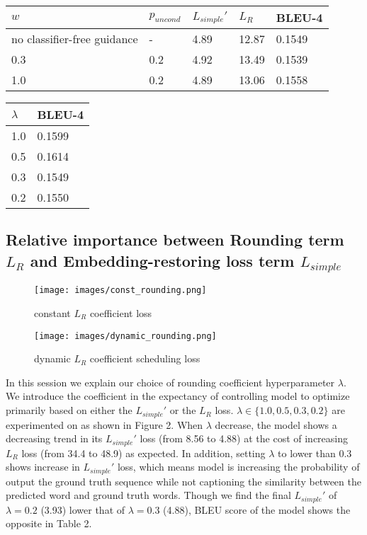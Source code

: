 \documentclass{article}
\begin{document}
\begin{minipage}[c]{0.5\textwidth}
\centering
\begin{tabular}{lllll}
\toprule
$w$ & $p_{uncond}$ & $L_{simple}'$ & $L_R$ & BLEU-4 \\
\midrule
no classifier-free guidance & - & 4.89 & 12.87 & 0.1549 \\
0.3 & 0.2 & 4.92 & 13.49 & 0.1539 \\
1.0 & 0.2 & 4.89 & 13.06 & 0.1558
\bottomrule
\end{tabular}
\label{tab:table1}
\end{minipage}
\begin{minipage}[c]{0.5\textwidth}
\centering
\begin{tabular}{ll}
\toprule
$\lambda$     & BLEU-4 \\
\midrule
1.0     & 0.1599 \\
0.5     & 0.1614 \\
0.3     & 0.1549 \\
0.2     & 0.1550
\bottomrule
\end{tabular}
\label{tab:const-lambda}
\end{minipage}


\subsection{Relative importance between Rounding term $L_R$ and Embedding-restoring loss term $L_{simple}$}
\label{sec:lambda-exp}
\begin{figure}
  \centering
  \texttt{[image: images/const\_rounding.png]}
  \caption{constant $L_R$ coefficient loss}
  \label{fig:const-lambda}
\end{figure}

\begin{figure}
  \centering
  \texttt{[image: images/dynamic\_rounding.png]}
  \caption{dynamic $L_R$ coefficient scheduling loss}
  \label{fig:dynamic-lambda}
\end{figure}

In this session we explain our choice of rounding coefficient hyperparameter $\lambda$. We introduce the coefficient in the expectancy of controlling model to optimize primarily based on either the $L_{simple}'$ or the $L_R$ loss. $\lambda \in \{1.0, 0.5, 0.3, 0.2\}$ are experimented on as shown in Figure 2. When $\lambda$ decrease, the model shows a decreasing trend in its $L_{simple}'$ loss (from 8.56 to 4.88) at the cost of increasing $L_R$ loss (from 34.4 to 48.9) as expected. In addition, setting $\lambda$ to lower than 0.3 shows increase in $L_{simple}'$ loss, which means model is increasing the probability of output the ground truth sequence while not captioning the similarity between the predicted word and ground truth words. Though we find the final $L_{simple}'$ of $\lambda = 0.2$ (3.93) lower that of $\lambda = 0.3$ (4.88), BLEU score of the model shows the opposite in Table 2. 
\end{document}
